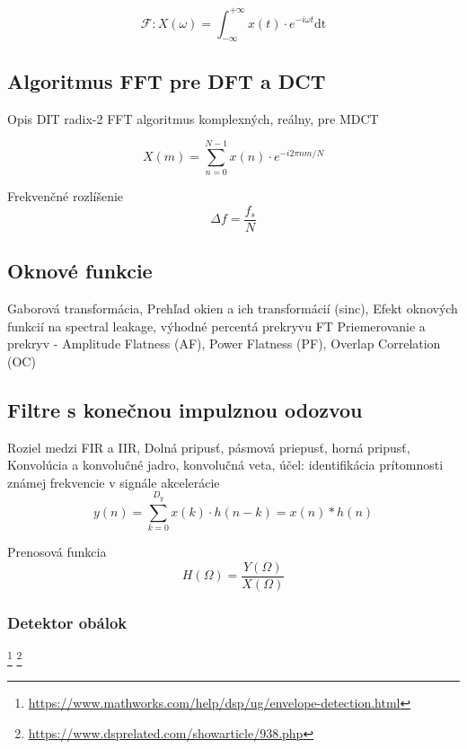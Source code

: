 \begin{equation}
\mathcal{F}: X(\omega) = \int_{-\infty}^{+\infty}{x(t) \cdot e^{-i\omega t} \mathrm{dt}}
\end{equation}

\subsection{Algoritmus FFT pre DFT a DCT}
Opis DIT radix-2 FFT algoritmus komplexných, reálny, pre MDCT \cite{fft-blackbox}

\begin{equation}
X(m) = \sum_{n = 0}^{N-1}{x(n) \cdot e^{-i2\pi n m / N}}
\end{equation}

Frekvenčné rozlíšenie
\begin{equation}
\Delta f = \frac{f_s}{N}
\end{equation}

\subsection{Oknové funkcie}
Gaborová transformácia, Prehľad okien a ich transformácií (sinc), Efekt oknových funkcií na spectral leakage, výhodné percentá prekryvu FT 	\cite{understanding-dsp} \cite{spectral-density-estimation}
Priemerovanie a prekryv - Amplitude Flatness (AF), Power Flatness (PF), Overlap Correlation (OC)

\subsection{Filtre s konečnou impulznou odozvou}
\label{fir-filter}
Roziel medzi FIR a IIR, Dolná pripusť, pásmová priepusť, horná pripusť,
 Konvolúcia a konvolučné jadro, konvolučná veta, účel: identifikácia prítomnosti známej frekvencie v signále akcelerácie
\begin{equation}
y(n) = \sum_{k=0}^{D_y}{x(k) \cdot h(n-k)} = x(n) * h(n)
\end{equation}

Prenosová funkcia
\begin{equation}
H(\Omega) = \frac{Y(\Omega)}{X(\Omega)}
\end{equation}

\subsubsection{Detektor obálok}
\footnote{\url{https://www.mathworks.com/help/dsp/ug/envelope-detection.html}}
\footnote{\url{https://www.dsprelated.com/showarticle/938.php}}

